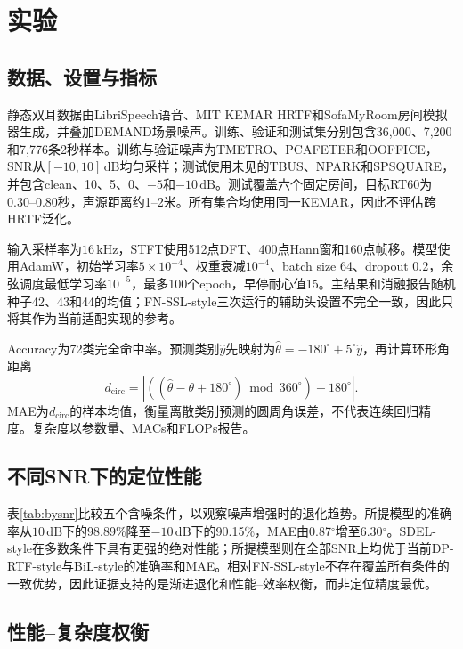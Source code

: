 \documentclass{article}
\begin{document}
\section{实验}
\label{sec:experiments}

\subsection{数据、设置与指标}

静态双耳数据由LibriSpeech语音\cite{panayotov2015}、MIT KEMAR HRTF\cite{gardner1995}和SofaMyRoom房间模拟器\cite{barumerli2021}生成，并叠加DEMAND场景噪声\cite{thiemann2013}。训练、验证和测试集分别包含36,000、7,200和7,776条2秒样本。训练与验证噪声为TMETRO、PCAFETER和OOFFICE，SNR从$[-10,10]\,\mathrm{dB}$均匀采样；测试使用未见的TBUS、NPARK和SPSQUARE，并包含clean、10、5、0、$-5$和$-10\,\mathrm{dB}$。测试覆盖六个固定房间，目标RT60为0.30--0.80秒，声源距离约1--2米。所有集合均使用同一KEMAR，因此不评估跨HRTF泛化。

输入采样率为$16\,\mathrm{kHz}$，STFT使用512点DFT、400点Hann窗和160点帧移。模型使用AdamW，初始学习率$5\times10^{-4}$、权重衰减$10^{-4}$、batch size 64、dropout 0.2，余弦调度最低学习率$10^{-5}$，最多100个epoch，早停耐心值15。主结果和消融报告随机种子42、43和44的均值；FN-SSL-style三次运行的辅助头设置不完全一致，因此只将其作为当前适配实现的参考。

Accuracy为72类完全命中率。预测类别$\hat y$先映射为$\hat\theta=-180^\circ+5^\circ\hat y$，再计算环形角距离
\begin{equation}
 d_{\mathrm{circ}}=\left|((\hat\theta-\theta+180^\circ)\bmod360^\circ)-180^\circ\right|.
\end{equation}
MAE为$d_{\mathrm{circ}}$的样本均值，衡量离散类别预测的圆周角误差，不代表连续回归精度。复杂度以参数量、MACs和FLOPs报告。

\subsection{不同SNR下的定位性能}

表\ref{tab:bysnr}比较五个含噪条件，以观察噪声增强时的退化趋势。所提模型的准确率从$10\,\mathrm{dB}$下的98.89\%降至$-10\,\mathrm{dB}$下的90.15\%，MAE由0.87$^\circ$增至6.30$^\circ$。SDEL-style在多数条件下具有更强的绝对性能；所提模型则在全部SNR上均优于当前DP-RTF-style与BiL-style的准确率和MAE。相对FN-SSL-style不存在覆盖所有条件的一致优势，因此证据支持的是渐进退化和性能--效率权衡，而非定位精度最优。

\subsection{性能--复杂度权衡}
\end{document}
